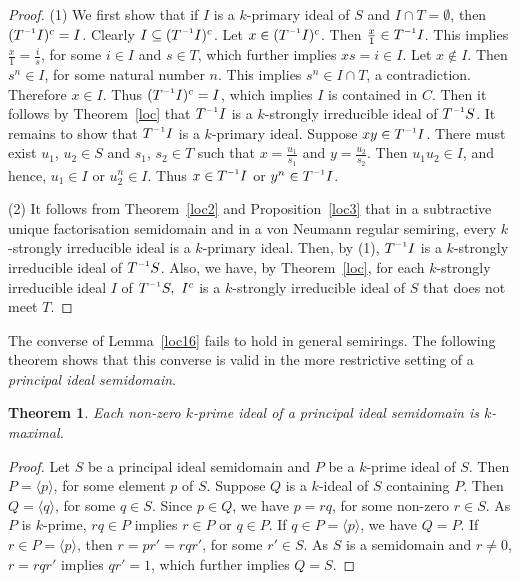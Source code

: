 \documentclass[11pt,leqno]{amsart}
\newcommand{\inv}{^{\raisebox{.2ex}{$\scriptscriptstyle-1$}}}
\newtheorem{theorem}{Theorem}[section]
\theoremstyle{definition}
\numberwithin{equation}{section}
\begin{document}
\begin{proof}
(1) We first show that if $I$ is a $k$-primary ideal of $S$ and $I\cap T=\emptyset$, then $(T\inv I)^c=I$. Clearly $I\subseteq (T\inv I)^c$. Let $x\in (T\inv I)^c$. Then $\frac{x}{1}\in T\inv I$. This implies $\frac{x}{1}=\frac{i}{s}$, for some $i\in I$ and $s\in T$, which further implies $xs=i\in I$. Let $x\notin I$. Then $s^n\in I$, for some natural number $n$. This implies $s^n\in I\cap T$, a contradiction. Therefore $x\in I$. Thus $(T\inv I)^c=I$, which implies $I$ is contained in $C$. Then it follows by Theorem~\ref{loc} that $T\inv I$ is a $k$-strongly irreducible ideal of $T\inv S$. It remains to show that $T\inv I$ is a $k$-primary ideal. Suppose $xy \in T\inv I$. There must exist $u_1$, $u_2 \in S$ and $s_1$, $s_2 \in T$ such that $x=\frac{u_1}{s_1} $ and $y=\frac{u_2}{s_2}$. Then $u_1 u_2 \in I$, and hence,  $u_1 \in I$ or $u_2^n \in I$. Thus $x\in T\inv I$ or $y^n \in T\inv I$.
    
(2) It follows from Theorem~\ref{loc2} and Proposition~\ref{loc3} that in a subtractive unique factorisation semidomain and in a von Neumann regular semiring, every $k$-strongly irreducible ideal is a $k$-primary ideal. Then, by (1), $T\inv I$ is a $k$-strongly irreducible ideal of $T\inv S$. Also, we have, by Theorem~\ref{loc}, for each $k$-strongly irreducible ideal $I$ of $T\inv S,\ I^c$ is a $k$-strongly irreducible ideal of $S$ that does not meet $T$.
\end{proof}

The converse of Lemma~\ref{loc16} fails to hold in general semirings. The following theorem shows that this converse is valid in the more restrictive setting of a \emph{principal ideal semidomain}.

\begin{theorem}
Each non-zero $k$-prime ideal of a principal ideal semidomain is $k$-maximal.
\end{theorem}

\begin{proof}
Let $S$ be a principal ideal semidomain and $P$ be a $k$-prime ideal of $S$. Then $P=\langle p \rangle$, for some element $p$ of $S$. Suppose $Q$ is a $k$-ideal of $S$ containing $P$. Then $Q=\langle q \rangle$, for some $q\in S$. Since $p\in Q$, we have $p=rq$, for some non-zero $r\in S$. As $P$ is $k$-prime, $rq\in P$ implies $r\in P$ or $q\in P$. If $q\in P=\langle p \rangle$, we have $Q=P$. If $r\in P=\langle p \rangle$, then $r=pr'=rqr'$, for some $r'\in S$. As $S$ is a semidomain and $r\neq 0$, $r=rqr'$ implies $qr'=1$, which further implies $Q=S$.	
\end{proof}
\end{document}

